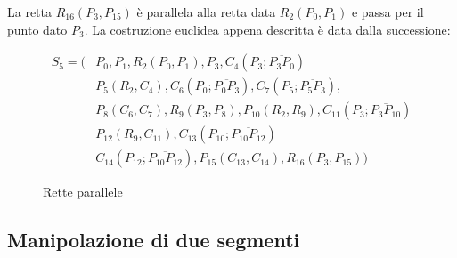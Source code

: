 \noindent 
La retta  $R_{16}(P_{3}, P_{15})$ è parallela alla retta data $R_{2}(P_{0}, P_{1})$ e passa per il punto dato $P_{3}$.
La costruzione euclidea appena descritta è data dalla successione: 


\begin{align*}
S_{5} = (&P_{0}, P_{1}, R_{2}(P_{0}, P_{1}), P_{3}, C_{4}(P_{3}; \overline{P_{3} P_{0}}) \\
&P_{5}(R_{2},C_{4}), C_{6}(P_{0}; \overline{P_{0} P_{3}}), C_{7}(P_{5}; \overline{P_{5} P_{3}}),  \\
&P_{8}(C_{6},C_{7}), R_{9}(P_{3}, P_{8}), P_{10}(R_{2},R_{9}), C_{11}(P_{3}; \overline{P_{3} P_{10}}) \\
&P_{12}(R_{9}, C_{11}), C_{13}(P_{10}; \overline{P_{10} P_{12}}) \\
&C_{14}(P_{12}; \overline{P_{10} P_{12}}), P_{15}(C_{13},C_{14}), R_{16}(P_{3}, P_{15}) )
\end{align*}

\begin{figure}[!h]
\begin{center}
\caption{Rette parallele}
\end{center}
\end{figure}



\subsection{Manipolazione di due segmenti}  \label{segm}

